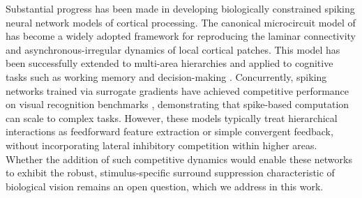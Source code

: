 %
Substantial progress has been made in developing biologically constrained spiking neural network models of cortical processing. The canonical microcircuit model of \citet{Potjans2014} has become a widely adopted framework for reproducing the laminar connectivity and asynchronous-irregular dynamics of local cortical patches. This model has been successfully extended to multi-area hierarchies \citep{Schmidt2018} and applied to cognitive tasks such as working memory and decision-making \citep{Brunel2001}. Concurrently, spiking networks trained via surrogate gradients have achieved competitive performance on visual recognition benchmarks \citep{Neftci2019}, demonstrating that spike-based computation can scale to complex tasks. However, these models typically treat hierarchical interactions as feedforward feature extraction or simple convergent feedback, without incorporating lateral inhibitory competition within higher areas. Whether the addition of such competitive dynamics would enable these networks to exhibit the robust, stimulus-specific surround suppression characteristic of biological vision remains an open question, which we address in this work.

